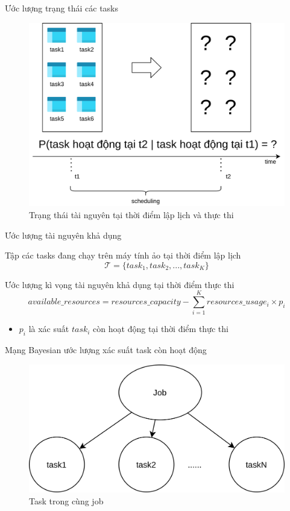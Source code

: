 \documentclass[11pt,xcolor={dvipsnames}, aspectratio=169]{beamer}
\begin{document}
\begin{frame}
{Ước lượng trạng thái các tasks}
\begin{figure}
	\centering
	\includegraphics[scale=0.5]{images/predicting_status3.png}
	\caption{Trạng thái tài nguyên tại thời điểm lập lịch và thực thi}
\end{figure}
\end{frame}

\begin{frame}
{Ước lượng tài nguyên khả dụng}
\pause
\begin{block}
{Tập các tasks đang chạy trên máy tính ảo tại thời điểm lập lịch}
\[
	\mathcal{T} = \{task_{1}, task_{2}, ..., task_{K}\}
\]
\end{block}
\pause
\begin{block}
{Ước lượng kì vọng tài nguyên khả dụng tại thời điểm thực thi}
\[
	available\_resources = resources\_capacity - \sum_{i = 1}^{K}{resources\_usage_{i} \times p_{i}}
\]
\begin{itemize}
	\item $p_{i}$ là xác suất $task_{i}$ còn hoạt động tại thời điểm thực thi
\end{itemize}
\end{block}
\end{frame}

\begin{frame}
{Mạng Bayesian ước lượng xác suất task còn hoạt động}
\pause
\begin{figure}
		\centering
		\includegraphics[scale=0.8]{images/job_decomposition.png}
		\caption{Task trong cùng job}
	\end{figure}
\end{frame}
\end{document}

